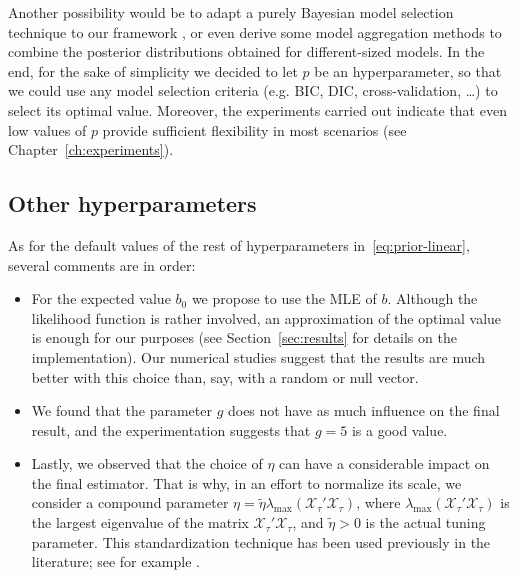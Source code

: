 


Another possibility would be to adapt a purely Bayesian model selection technique to our framework \citep[see][]{piironen2017comparison, gelman2013bayesian},  or even derive some model aggregation methods to combine the posterior distributions obtained for different-sized models. In the end, for the sake of simplicity we decided to let \(p\) be an hyperparameter, so that we could use any model selection criteria (e.g. BIC, DIC, cross-validation, \ldots) to select its optimal value. Moreover, the experiments carried out indicate that even low values of \(p\) provide sufficient flexibility in most scenarios (see Chapter~\ref{ch:experiments}).

\subsection*{Other hyperparameters}

As for the default values of the rest of hyperparameters in~\eqref{eq:prior-linear}, several comments are in order:
\begin{itemize}
  \item For the expected value \(b_0\) we propose to use the MLE of \(b\). Although the likelihood function is rather involved, an approximation of the optimal value is enough for our purposes (see Section~\ref{sec:results} for details on the implementation). Our numerical studies suggest that the results are much better with this choice than, say, with a random or null vector.
  \item We found that the parameter \(g\) does not have as much influence on the final result, and the experimentation suggests that \(g=5\) is a good value.
  \item Lastly, we observed that the choice of \(\eta\) can have a considerable impact on the final estimator. That is why, in an effort to normalize its scale, we consider a compound parameter \(\eta = \tilde \eta \lambda_{\max}(\mathcal X_\tau'\mathcal X_\tau)\), where \(\lambda_{\max}(\mathcal X_\tau'\mathcal X_\tau)\) is the largest eigenvalue of the matrix \(\mathcal X_\tau'\mathcal X_\tau\), and \(\tilde\eta > 0\) is the actual tuning parameter. This standardization technique has been used previously in the literature; see for example \citet{grollemund2019bayesian}.
\end{itemize}

